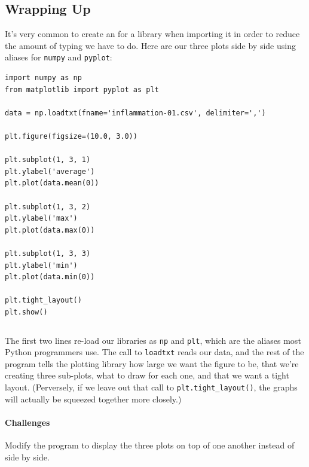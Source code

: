 \documentclass{book}
\begin{document}
\subsection{Wrapping Up}

It's very common to create an  for a
library when importing it in order to reduce the amount of typing we
have to do. Here are our three plots side by side using aliases for
\texttt{numpy} and \texttt{pyplot}:

\begin{verbatim}
import numpy as np
from matplotlib import pyplot as plt

data = np.loadtxt(fname='inflammation-01.csv', delimiter=',')

plt.figure(figsize=(10.0, 3.0))

plt.subplot(1, 3, 1)
plt.ylabel('average')
plt.plot(data.mean(0))

plt.subplot(1, 3, 2)
plt.ylabel('max')
plt.plot(data.max(0))

plt.subplot(1, 3, 3)
plt.ylabel('min')
plt.plot(data.min(0))

plt.tight_layout()
plt.show()
\end{verbatim}

\begin{verbatim}
\end{verbatim}

The first two lines re-load our libraries as \texttt{np} and
\texttt{plt}, which are the aliases most Python programmers use. The
call to \texttt{loadtxt} reads our data, and the rest of the program
tells the plotting library how large we want the figure to be, that
we're creating three sub-plots, what to draw for each one, and that we
want a tight layout. (Perversely, if we leave out that call to
\texttt{plt.tight\_layout()}, the graphs will actually be squeezed
together more closely.)

\mbox{}\paragraph{Challenges}

\begin{swcenumerate}
\item
  Modify the program to display the three plots on top of one another
  instead of side by side.
\end{swcenumerate}
\end{document}
